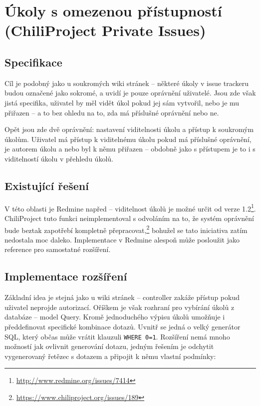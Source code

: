 \documentclass[thesis=B,czech]{FITthesis}[2012/05/02]
\begin{document}
\section[Úkoly s omezenou přístupností]{Úkoly s omezenou přístupností (ChiliProject Private Issues)}
\label{sec:private_issues}

\subsection{Specifikace}

Cíl je podobný jako u soukromých wiki stránek -- některé úkoly v issue
trackeru budou označené jako sokromé, a uvidí je pouze oprávnění
uživatelé. Jsou zde však jistá specifika, uživatel by měl vidět úkol
pokud jej sám vytvořil, nebo je mu přiřazen -- a to bez ohledu na to,
zda má příslušné oprávnění nebo ne.

Opět jsou zde dvě oprávnění: nastavení viditelnosti úkolu a přístup
k soukromým úkolům. Uživatel má přístup k viditelnému úkolu pokud má
příslušné oprávnění, je autorem úkolu a nebo byl k němu přiřazen --
obdobně jako s přístupem je to i s viditelností úkolu v přehledu úkolů.

\subsection{Existující řešení}
\label{sec:private_issues_exist}

V této oblasti je Redmine napřed -- viditelnost úkolů je možné určit od
verze 1.2\footnote{\url{http://www.redmine.org/issues/7414}}.
ChiliProject tuto funkci neimplementoval s odvoláním na to, že systém
oprávnění bude beztak zapotřebí kompletně přepracovat,\footnote{\url{https://www.chiliproject.org/issues/189}}
bohužel se tato iniciativa zatím nedostala moc daleko. Implementace
v Redmine alespoň může posloužit jako reference pro samostatné
rozšíření.

\subsection{Implementace rozšíření}

Základní idea je stejná jako u wiki stránek -- controller zakáže přístup
pokud uživatel neprojde autorizací. Oříškem je však rozhraní pro
vybírání úkolů z databáze -- model Query. Kromě jednoduchého výpisu
úkolů umožňuje i předdefinovat specifické kombinace dotazů. Uvnitř se
jedná o velký generátor SQL, který občas může vrátit klauzuli
\lstinline!WHERE 0=1!. Rozšíření nemá mnoho možností jak ovlivnit
generování dotazu, jedným řešením je odchytit vygenerovaný řetězec
s dotazem a připojit k němu vlastní podmínky:
\end{document}
